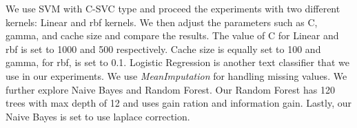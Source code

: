 \documentclass[letterpaper, 12pt]{article}
\begin{document}
We use SVM with C-SVC type and proceed the experiments with two different kernels: Linear and rbf 
kernels. We then adjust the parameters such as C, gamma, and cache size and compare the results. 
The value of C for Linear and rbf is set to 1000 and 500 respectively. Cache size is equally set 
to 100 and gamma, for rbf, is set to 0.1.  Logistic Regression is another text classifier that we use in our experiments. We use \emph{MeanImputation}
for handling missing values. We further explore Naive Bayes and Random Forest. Our Random Forest has 120 trees 
with max depth of 12 and uses gain ration and information gain. Lastly, our Naive Bayes is set to 
use laplace correction. 


\begin{table}[t]
        \centering
        \caption{Classification methods results}
        \label{fig:res}
        \end{table}
\end{document}
